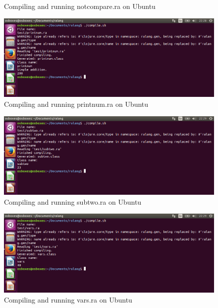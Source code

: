 \documentclass[a4paper]{article}
\begin{document}
\begin{appendices}
\begin{figure}[h!]
		\caption[Compiling and running notcompare.ra on Ubuntu 15.10 64-bit]{Compiling and running notcompare.ra on Ubuntu}
		\label{fig:ubuntu_notcompare}
	\end{figure}
	\begin{figure}[h!]
		\centering
		\includegraphics[width=\linewidth]{images/ubuntu_printnum.png}
		\caption[Compiling and running printnum.ra on Ubuntu 15.10 64-bit]{Compiling and running printnum.ra on Ubuntu}
		\label{fig:ubuntu_printnum}
	\end{figure}
	\begin{figure}[h!]
		\centering
		\includegraphics[width=\linewidth]{images/ubuntu_subtwo.png}
		\caption[Compiling and running subtwo.ra on Ubuntu 15.10 64-bit]{Compiling and running subtwo.ra on Ubuntu}
		\label{fig:ubuntu_subtwo}
	\end{figure}
	\newpage
	\begin{figure}[h!]
		\centering
		\includegraphics[width=\linewidth]{images/ubuntu_vars.png}
		\caption[Compiling and running vars.ra on Ubuntu 15.10 64-bit]{Compiling and running vars.ra on Ubuntu}

\end{figure}
\end{appendices}
\end{document}
